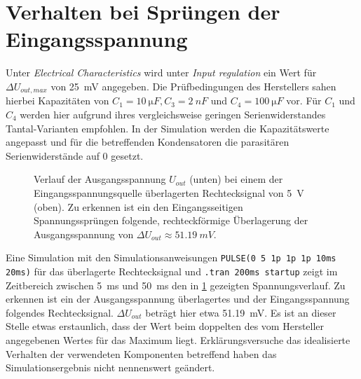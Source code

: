 	\section{Verhalten bei Sprüngen der Eingangsspannung}\label{sec:ripple am eingang}
		Unter \textit{Electrical Characteristics} wird unter \textit{Input regulation} ein Wert für \(\Delta U_{out,max}\) von \SI{25}{mV} angegeben.
		Die Prüfbedingungen des Herstellers sahen hierbei Kapazitäten von \(C_1 = \SI{10}{\micro F}, C_3 = \SI{2}{nF}\) und \(C_4 = \SI{100}{\micro F}\) vor.
		Für \(C_1\) und \(C_4\) werden hier aufgrund ihres vergleichsweise geringen Serienwiderstandes Tantal-Varianten empfohlen. In der Simulation werden
		die Kapazitätswerte angepasst und für die betreffenden Kondensatoren die parasitären Serienwiderstände auf 0 gesetzt.
		\begin{figure}[h]
			\centering
			
			\caption[Verlauf der Ausgangsspannung bei rechteckförmigen Sprüngen der Eingangsspannung]{Verlauf der Ausgangsspannung \(U_{out}\) (unten) bei einem der Eingangsspannungsquelle überlagerten Rechtecksignal von \SI{5}{V} (oben).
			Zu erkennen ist ein den Eingangsseitigen Spannungssprüngen folgende, rechteckförmige Überlagerung der Ausgangsspannung von \(\Delta U_{out} \approx \SI{51,19}{mV}\).}
			\label{fig:verlauf eingangsripple}
		\end{figure}
		Eine Simulation mit den Simulationsanweisungen \texttt{PULSE(0 5 1p 1p 1p 10ms 20ms)} für das überlagerte Rechtecksignal und \texttt{.tran 200ms startup}
		zeigt im Zeitbereich zwischen \SI{5}{ms} und \SI{50}{ms} den in \cref{fig:verlauf eingangsripple} gezeigten Spannungsverlauf. Zu erkennen ist ein
		der Ausgangsspannung überlagertes und der Eingangsspannung folgendes Rechtecksignal. \(\Delta U_{out}\) beträgt hier etwa \SI{51,19}{mV}.
		Es ist an dieser Stelle etwas erstaunlich, dass der Wert beim doppelten des vom Hersteller angegebenen Wertes für das Maximum liegt. Erklärungsversuche
		das idealisierte Verhalten der verwendeten Komponenten betreffend haben das Simulationsergebnis nicht nennenswert geändert.
